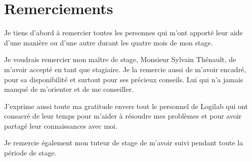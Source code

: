 \chapter*{Remerciements}
Je tiens d’abord à remercier toutes les personnes qui m’ont apporté leur aide d’une manière ou d’une autre durant les quatre mois de mon stage.

Je voudrais remercier mon maître de stage, Monsieur Sylvain Thénault, de m’avoir accepté en tant que stagiaire. Je la remercie aussi de m’avoir encadré, pour sa disponibilité et surtout pour ses précieux conseils. Lui qui n’a jamais manqué de m’orienter et de me conseiller.

J’exprime aussi toute ma gratitude envers tout le personnel de Logilab qui ont consacré de leur temps pour m'aider à résoudre mes problèmes et pour avoir partagé leur connaissances avec moi.

Je remercie également mon tuteur de stage de m’avoir suivi pendant toute la période de stage.